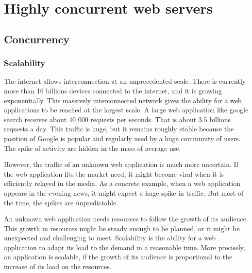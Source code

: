 
\section{Highly concurrent web servers}

\subsection{Concurrency}

\subsubsection{Scalability}

The internet allows interconnection at an unprecedented scale.
There is currently more than 16 billions devices connected to the internet, and it is growing exponentially.
This massively interconnected network gives the ability for a web applications to be reached at the largest scale.
A large web application like google search receives about 40 000 requests per seconds.
That is about 3.5 billions requests a day.
This traffic is huge, but it remains roughly stable because the position of Google is popular and regularly used by a huge community of users.
The spike of activity are hidden in the mass of average use.


However, the traffic of an unknown web application is much more uncertain.
If the web application fits the market need, it might become viral when it is efficiently relayed in the media.
As a concrete example, when a web application appears in the evening news, it might expect a huge spike in traffic.
But most of the time, the spikes are unpredictable.

An unknown web application needs resources to follow the growth of its audience.
This growth in resources might be steady enough to be planned, or it might be unexpected and challenging to meet.
Scalability is the ability for a web application to adapt its load to the demand in a reasonable time.
More precisely, an application is scalable, if the growth of its audience is proportional to the increase of its load on the resources.

